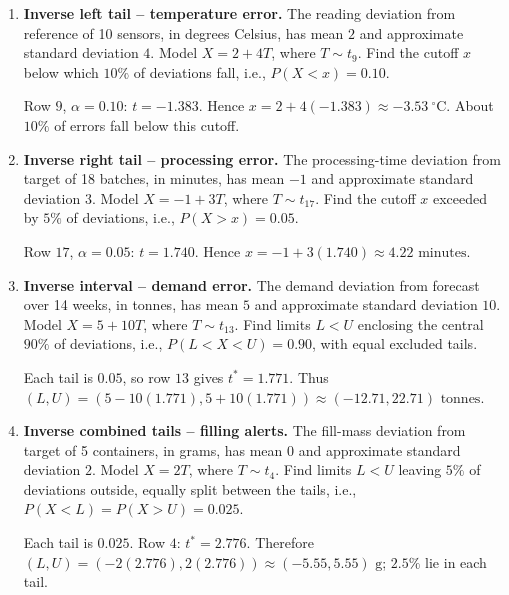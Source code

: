 \begin{enumerate}[leftmargin=*,itemsep=7pt,parsep=0pt,topsep=2pt]
		\item \textbf{Inverse left tail -- temperature error.} The reading deviation from reference of 10 sensors, in degrees Celsius, has mean $2$ and approximate standard deviation $4$. Model $X=2+4T$, where $T\sim t_{9}$. Find the cutoff $x$ below which $10\%$ of deviations fall, i.e., $P(X<x)=0.10$.
		\par Row $9$, $\alpha=0.10$: $t=-1.383$. Hence $x=2+4(-1.383)\approx\boxed{-3.53\ ^\circ\mathrm{C}}$. About $10\%$ of errors fall below this cutoff.
		
		\item \textbf{Inverse right tail -- processing error.} The processing-time deviation from target of 18 batches, in minutes, has mean $-1$ and approximate standard deviation $3$. Model $X=-1+3T$, where $T\sim t_{17}$. Find the cutoff $x$ exceeded by $5\%$ of deviations, i.e., $P(X>x)=0.05$.
		\par Row $17$, $\alpha=0.05$: $t=1.740$. Hence $x=-1+3(1.740)\approx\boxed{4.22\text{ minutes}}$.
		
		\item \textbf{Inverse interval -- demand error.} The demand deviation from forecast over 14 weeks, in tonnes, has mean $5$ and approximate standard deviation $10$. Model $X=5+10T$, where $T\sim t_{13}$. Find limits $L<U$ enclosing the central $90\%$ of deviations, i.e., $P(L<X<U)=0.90$, with equal excluded tails.
		\par Each tail is $0.05$, so row $13$ gives $t^*=1.771$. Thus $(L,U)=(5-10(1.771),5+10(1.771))\approx\boxed{(-12.71,22.71)\text{ tonnes}}$.
		
		\item \textbf{Inverse combined tails -- filling alerts.} The fill-mass deviation from target of 5 containers, in grams, has mean $0$ and approximate standard deviation $2$. Model $X=2T$, where $T\sim t_{4}$. Find limits $L<U$ leaving $5\%$ of deviations outside, equally split between the tails, i.e., $P(X<L)=P(X>U)=0.025$.
		\par Each tail is $0.025$. Row $4$: $t^*=2.776$. Therefore $(L,U)=(-2(2.776),2(2.776))\approx\boxed{(-5.55,5.55)\text{ g}}$; $2.5\%$ lie in each tail.
	\end{enumerate}
	
